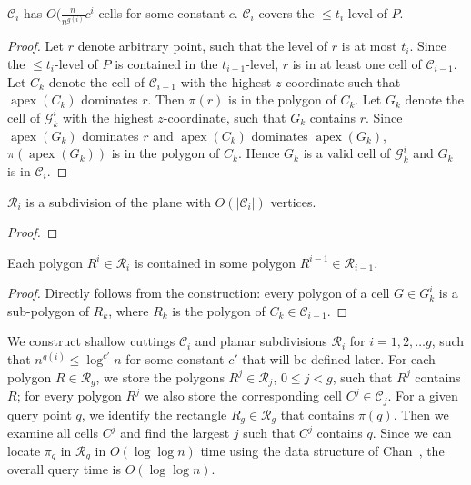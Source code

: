 \documentclass[anonymous,a4paper,USenglish,cleveref,autoref,thm-restate] {socg-lipics-v2021}
\newcommand{\apex}{\operatorname{apex}}
\newcommand{\cC}{\mathcal{C}}
\newcommand{\cG}{\mathcal{G}}
\newcommand{\cR}{\mathcal{R}}
\begin{document}
\begin{lemma}
  $\cC_i$ has  $O(\frac{n}{n^{g(i)}}c^i$ cells for some constant $c$.  $\cC_i$ covers the $\leq t_i$-level of $P$.
\end{lemma}
\begin{proof}
  Let $r$ denote arbitrary point, such that the level of $r$ is at most $t_i$.  Since the $\leq t_i$-level of $P$ is contained in the $t_{i-1}$-level, $r$ is in at least one cell of $\cC_{i-1}$. Let $C_k$ denote the cell of $\cC_{i-1}$ with the highest $z$-coordinate such that $\apex(C_k)$ dominates $r$.  Then $\pi(r)$ is in the polygon of $C_k$.  Let $G_k$ denote the cell of $\cG^i_k$ with the highest $z$-coordinate, such that $G_k$ contains $r$. Since   $\apex(G_k)$ dominates $r$  and $\apex(C_k)$ dominates $\apex(G_k)$,  $\pi(\apex(G_k))$  is in the polygon of $C_k$. Hence $G_k$ is a valid cell of $\cG^i_k$ and $G_k$ is in $\cC_i$.
\end{proof}

\begin{lemma}
  \label{lemma:subdiv-size}
  $\cR_i$ is a subdivision of the plane with $O(|\cC_i|)$ vertices. 
\end{lemma}
\begin{proof}
  
\end{proof}


\begin{lemma}
  \label{lemma:rect-contain}
  Each polygon $R^i\in \cR_i$ is contained in some polygon $R^{i-1}\in \cR_{i-1}$.  
\end{lemma}
\begin{proof}
  Directly follows from the construction: every polygon of a cell $G\in G^i_k$ is a sub-polygon of $R_k$, where $R_k$ is the polygon of $C_k\in \cC_{i-1}$.
\end{proof}

We construct shallow cuttings $\cC_i$ and planar subdivisions $\cR_i$ for $i=1,2,\ldots g$, such that $n^{g(i)}\leq \log^{c'}n$ for some constant $c'$ that will be defined later.  For each polygon $R\in \cR_g$, we store the polygons $R^j\in \cR_j$, $0\le j < g$, such that $R^j$ contains $R$;
for every polygon $R^j$ we also store the corresponding cell $C^j\in \cC_j$.  For a given query point $q$, we identify the rectangle $R_g\in \cR_g$ that contains $\pi(q)$.   Then we examine all cells $C^j$ and find the largest $j$ such that $C^j$ contains $q$.  Since we can locate $\pi_q$ in $\cR_g$ in $O(\log\log n)$ time using the data structure of Chan~\cite{Chan??}, the overall query time is $O(\log \log n)$.
\end{document}
